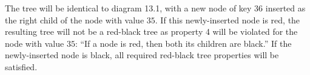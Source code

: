 The tree will be identical to diagram 13.1, with a new node of key $ 36 $ inserted as the right child of the node with value $ 35 $. If this newly-inserted node is red, the resulting tree will not be a red-black tree as property 4 will be violated for the node with value $ 35 $: ``If a node is red, then both its children are black.'' If the newly-inserted node is black, all required red-black tree properties will be satisfied.